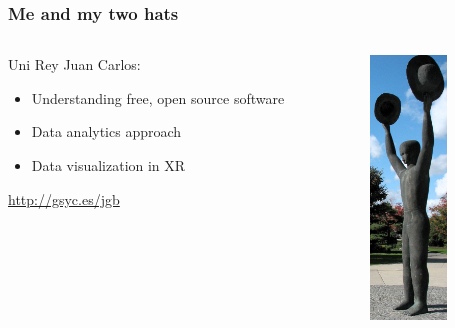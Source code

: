 \documentclass[17pt,aspectratio=169,hyperref=pdfusetitle]{beamer}
\begin{document}
\begin{frame}
\frametitle{Me and my two hats}

\begin{columns}[T]
\begin{column}{.80\textwidth}

Uni Rey Juan Carlos:

\begin{itemize}
\item Understanding free, open source software
\item Data analytics approach
\item Data visualization in XR
\end{itemize}

\begin{flushright}
\url{http://gsyc.es/jgb}
\end{flushright}

\end{column}%
\hfill%
\begin{column}{.18\textwidth}
  \includegraphics[height=7cm]{figs/two-hats}
\end{column}%
\end{columns}

\end{frame}

\end{document}

